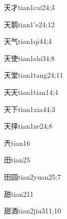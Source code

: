 \begin{verbete}{天才}{tian1cai2}{4;3}
\end{verbete}

\begin{verbete}{天鹅}{tian1'e2}{4;12}
\end{verbete}

\begin{verbete}{天气}{tian1qi4}{4;4}
\end{verbete}

\begin{verbete}{天使}{tian1shi3}{4;8}
\end{verbete}

\begin{verbete}{天堂}{tian1tang2}{4;11}
\end{verbete}

\begin{verbete}{天天}{tian1tian1}{4;4}
\end{verbete}

\begin{verbete}{天下}{tian1xia4}{4;3}
\end{verbete}

\begin{verbete}{天择}{tian1ze2}{4;8}
\end{verbete}

\begin{verbete}{兲}{tian1}{6}
\end{verbete}

\begin{verbete}{田}{tian2}{5}
\end{verbete}

\begin{verbete}{田园}{tian2yuan2}{5;7}
\end{verbete}

\begin{verbete}{甜}{tian2}{11}
\end{verbete}

\begin{verbete}{甜酒}{tian2jiu3}{11;10}
\end{verbete}


